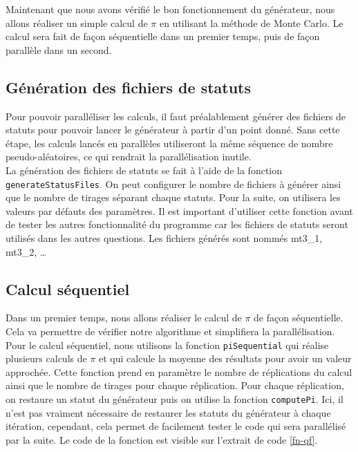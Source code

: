 \documentclass[a4paper]{article}
\begin{document}
Maintenant que nous avons vérifié le bon fonctionnement du générateur, nous
allons réaliser un simple calcul de $\pi$ en utilisant la méthode de Monte
Carlo. Le calcul sera fait de façon séquentielle dans un premier temps, puis de
façon parallèle dans un second.

\subsection{Génération des fichiers de statuts}

Pour pouvoir paralléliser les calculs, il faut préalablement générer des
fichiers de statuts pour pouvoir lancer le générateur à partir d'un point donné.
Sans cette étape, les calculs lancés en parallèles utiliseront la même séquence
de nombre pseudo-aléatoires, ce qui rendrait la parallélisation inutile.\\

La génération des fichiers de statuts se fait à l'aide de la fonction
\texttt{generateStatusFiles}. On peut configurer le nombre de fichiers à
générer ainsi que le nombre de tirages séparant chaque statuts. Pour la suite,
on utilisera les valeurs par défauts des paramètres. Il est important d'utiliser
cette fonction avant de tester les autres fonctionnalité du programme car les
fichiers de statuts seront utilisés dans les autres questions. Les fichiers
générés sont nommés mt3\_1, mt3\_2, \dots

\subsection{Calcul séquentiel}

Dans un premier temps, nous allons réaliser le calcul de $\pi$ de façon
séquentielle. Cela va permettre de vérifier notre algorithme et simplifiera la
parallélisation.\\

Pour le calcul séquentiel, nous utilisons la fonction \texttt{piSequential} qui
réalise plusieurs calculs de $\pi$ et qui calcule la moyenne des résultats pour
avoir un valeur approchée. Cette fonction prend en paramètre le nombre de
réplications du calcul ainsi que le nombre de tirages pour chaque réplication.
Pour chaque réplication, on restaure un statut du générateur puis on utilise la
fonction \texttt{computePi}. Ici, il n'est pas vraiment nécessaire de
restaurer les statuts du générateur à chaque itération, cependant, cela permet
de facilement tester le code qui sera parallélisé par la suite. Le code de la
fonction est visible sur l'extrait de code \ref{fn-qf}.
\clearpage
\end{document}
